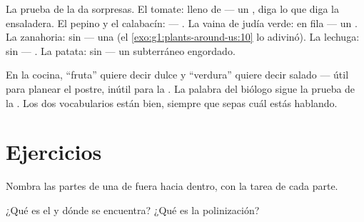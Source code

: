 \begin{example}\label{ex:g3:flowers-fruits-seeds:surprise}
La prueba de la  da sorpresas. El tomate: lleno de  ---
un , diga lo que diga la ensaladera. El pepino y el calabacín:
 --- . La vaina de judía verde:  en fila --- un
. La zanahoria: sin  --- una  (el
\cref{exo:g1:plants-around-us:10} lo adivinó). La lechuga: sin
 --- . La patata: sin  --- un  subterráneo
engordado.
\end{example}

\begin{remark}\label{rem:g3:flowers-fruits-seeds:words}
En la cocina, ``fruta'' quiere decir dulce y ``verdura'' quiere decir
salado --- útil para planear el postre, inútil para la . La
palabra del biólogo sigue la prueba de la . Los dos
vocabularios están bien, siempre que sepas cuál estás hablando.
\end{remark}

\section{Ejercicios}

\begin{exercise}[$\star$]\label{exo:g3:flowers-fruits-seeds:1}
Nombra las partes de una  de fuera hacia dentro, con la tarea de
cada parte.
\end{exercise}

\begin{exercise}[$\star$]\label{exo:g3:flowers-fruits-seeds:2}
¿Qué es el  y dónde se encuentra? ¿Qué es la polinización?
\end{exercise}

